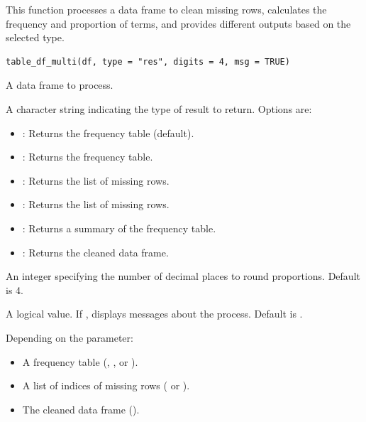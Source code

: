 \documentclass[a4paper]{book}
\begin{document}
%
\begin{Description}
This function processes a data frame to clean missing rows, calculates the frequency
and proportion of terms, and provides different outputs based on the selected type.
\end{Description}
%
\begin{Usage}
\begin{verbatim}
table_df_multi(df, type = "res", digits = 4, msg = TRUE)
\end{verbatim}
\end{Usage}
%
\begin{Arguments}
\begin{ldescription}
\item[\code{df}] A data frame to process.

\item[\code{type}] A character string indicating the type of result to return. Options are:
\begin{itemize}

\item{} : Returns the frequency table (default).
\item{} : Returns the frequency table.
\item{} : Returns the list of missing rows.
\item{} : Returns the list of missing rows.
\item{} : Returns a summary of the frequency table.
\item{} : Returns the cleaned data frame.

\end{itemize}


\item[\code{digits}] An integer specifying the number of decimal places to round proportions. Default is 4.

\item[\code{msg}] A logical value. If , displays messages about the process. Default is .
\end{ldescription}
\end{Arguments}
%
\begin{Value}
Depending on the  parameter:
\begin{itemize}

\item{} A frequency table (, , or ).
\item{} A list of indices of missing rows ( or ).
\item{} The cleaned data frame ().

\end{itemize}

\end{Value}
\end{document}
